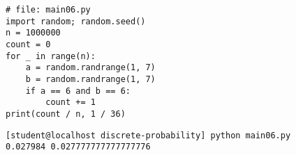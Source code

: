 \begin{Verbatim}[frame=single,fontsize=\footnotesize]
# file: main06.py
import random; random.seed()
n = 1000000
count = 0
for _ in range(n):
    a = random.randrange(1, 7)
    b = random.randrange(1, 7)
    if a == 6 and b == 6:
        count += 1
print(count / n, 1 / 36)
\end{Verbatim}
{\footnotesize \begin{Verbatim}[frame=single,fontsize=\small]
[student@localhost discrete-probability] python main06.py
0.027984 0.027777777777777776
\end{Verbatim}
}

